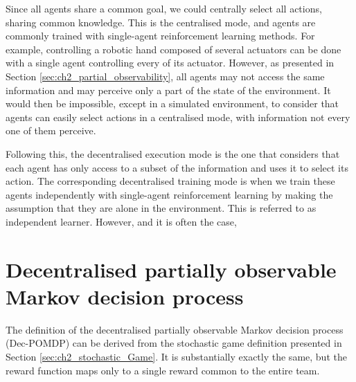 Since all agents share a common goal, we could centrally select all actions, sharing common knowledge.
This is the centralised mode, and agents are commonly trained with single-agent reinforcement learning methods.
For example, controlling a robotic hand composed of several actuators can be done with a single agent controlling every of its actuator.
However, as presented in Section \ref{sec:ch2_partial_observability}, all agents may not access the same information and may perceive only a part of the state of the environment.
It would then be impossible, except in a simulated environment, to consider that agents can easily select actions in a centralised mode, with information not every one of them perceive.

Following this, the decentralised execution mode is the one that considers that each agent has only access to a subset of the information and uses it to select its action.
The corresponding decentralised training mode is when we train these agents independently with single-agent reinforcement learning by making the assumption that they are alone in the environment.
This is referred to as independent learner.
However, and it is often the case, 


\section{Decentralised partially observable Markov decision process}
\label{sec:ch3_decpomdp}
The definition of the decentralised partially observable Markov decision process (Dec-POMDP) \citep{DecPomdp} can be derived from the stochastic game definition presented in Section \ref{sec:ch2_stochastic_Game}.
It is substantially exactly the same, but the reward function maps only to a single reward common to the entire team.

